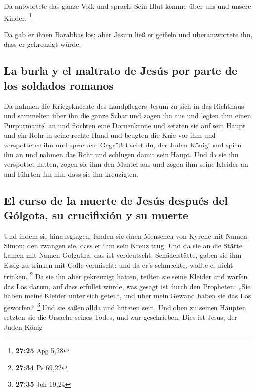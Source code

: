  Da antwortete das ganze Volk und sprach: Sein Blut komme
über uns und unsere Kinder. \footnote{\textbf{27:25} Apg 5,28}

 Da gab er ihnen Barabbas los; aber Jesum ließ er geißeln
und überantwortete ihn, dass er gekreuzigt würde.

\hypertarget{la-burla-y-el-maltrato-de-jesuxfas-por-parte-de-los-soldados-romanos}{%
\subsection{La burla y el maltrato de Jesús por parte de los soldados
romanos}\label{la-burla-y-el-maltrato-de-jesuxfas-por-parte-de-los-soldados-romanos}}

 Da nahmen die Kriegsknechte des Landpflegers Jesum zu
sich in das Richthaus und sammelten über ihn die ganze Schar
 und zogen ihn aus und legten ihm einen Purpurmantel an
 und flochten eine Dornenkrone und setzten sie auf sein
Haupt und ein Rohr in seine rechte Hand und beugten die Knie vor ihm und
verspotteten ihn und sprachen: Gegrüßet seist du, der Juden König!
 und spien ihn an und nahmen das Rohr und schlugen damit
sein Haupt.  Und da sie ihn verspottet hatten, zogen sie
ihm den Mantel aus und zogen ihm seine Kleider an und führten ihn hin,
dass sie ihn kreuzigten.

\hypertarget{el-curso-de-la-muerte-de-jesuxfas-despuuxe9s-del-guxf3lgota-su-crucifixiuxf3n-y-su-muerte}{%
\subsection{El curso de la muerte de Jesús después del Gólgota, su
crucifixión y su
muerte}\label{el-curso-de-la-muerte-de-jesuxfas-despuuxe9s-del-guxf3lgota-su-crucifixiuxf3n-y-su-muerte}}

 Und indem sie hinausgingen, fanden sie einen Menschen
von Kyrene mit Namen Simon; den zwangen sie, dass er ihm sein Kreuz
trug.  Und da sie an die Stätte kamen mit Namen Golgatha,
das ist verdeutscht: Schädelstätte,  gaben sie ihm Essig
zu trinken mit Galle vermischt; und da er's schmeckte, wollte er nicht
trinken. \footnote{\textbf{27:34} Ps 69,22}  Da sie ihn
aber gekreuzigt hatten, teilten sie seine Kleider und warfen das Los
darum, auf dass erfüllet würde, was gesagt ist durch den Propheten: „Sie
haben meine Kleider unter sich geteilt, und über mein Gewand haben sie
das Los geworfen.`` \footnote{\textbf{27:35} Joh 19,24} 
Und sie saßen allda und hüteten sein.  Und oben zu seinen
Häupten setzten sie die Ursache seines Todes, und war geschrieben: Dies
ist Jesus, der Juden König.

